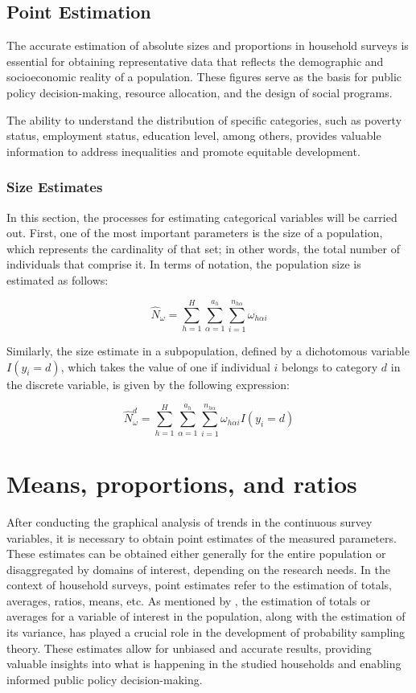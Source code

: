 \documentclass[
  12pt,
]{book}
\begin{document}
\subsection{Point Estimation}\label{point-estimation}

The accurate estimation of absolute sizes and proportions in household surveys is essential for obtaining representative data that reflects the demographic and socioeconomic reality of a population. These figures serve as the basis for public policy decision-making, resource allocation, and the design of social programs.

The ability to understand the distribution of specific categories, such as poverty status, employment status, education level, among others, provides valuable information to address inequalities and promote equitable development.

\subsubsection{Size Estimates}\label{size-estimates}

In this section, the processes for estimating categorical variables will be carried out. First, one of the most important parameters is the size of a population, which represents the cardinality of that set; in other words, the total number of individuals that comprise it. In terms of notation, the population size is estimated as follows:

\[
\hat{N}_{\omega} = \sum_{h=1}^{H}\sum_{\alpha=1}^{a_{h}}\sum_{i=1}^{n_{h\alpha}}\omega_{h\alpha i}
\]

Similarly, the size estimate in a subpopulation, defined by a dichotomous variable \(I(y_i = d)\), which takes the value of one if individual \(i\) belongs to category \(d\) in the discrete variable, is given by the following expression:

\[
\hat{N}^d_{\omega} = \sum_{h=1}^{H}\sum_{\alpha=1}^{a_{h}}\sum_{i=1}^{n_{h\alpha}}\omega_{h\alpha i}I(y_i = d)
\]

\section{Means, proportions, and ratios}\label{means-proportions-and-ratios}

After conducting the graphical analysis of trends in the continuous survey variables, it is necessary to obtain point estimates of the measured parameters. These estimates can be obtained either generally for the entire population or disaggregated by domains of interest, depending on the research needs. In the context of household surveys, point estimates refer to the estimation of totals, averages, ratios, means, etc. As mentioned by \citet{Heeringa_West_Berglund_2017}, the estimation of totals or averages for a variable of interest in the population, along with the estimation of its variance, has played a crucial role in the development of probability sampling theory. These estimates allow for unbiased and accurate results, providing valuable insights into what is happening in the studied households and enabling informed public policy decision-making.
\end{document}
